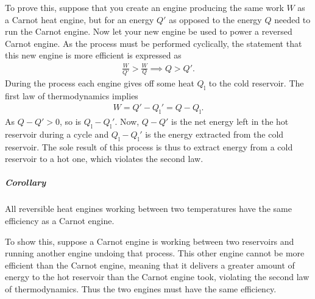 To prove this, suppose that you create an engine producing the same work $W$ as a Carnot heat engine, but for an energy $Q'$ as opposed to the energy $Q$ needed to run the Carnot engine. Now let your new engine be used to power a reversed Carnot engine. As the process must be performed cyclically, the statement that this new engine is more efficient is expressed as
\begin{align*}
	\frac{W}{Q'} > \frac{W}{Q} \implies Q > Q'.
\end{align*}
During the process each engine gives off some heat $Q_{\text{l}}$ to the cold reservoir. The first law of thermodynamics implies
\begin{align*}
	W = Q' - Q_{\text{l}}' = Q - Q_{\text{l}}.
\end{align*}
As $Q - Q' > 0$, so is $Q_{\text{l}} - Q_{\text{l}}'$. Now, $Q - Q'$ is the net energy left in the hot reservoir during a cycle and $Q_{\text{l}} - Q_{\text{l}}'$ is the energy extracted from the cold reservoir. The sole result of this process is thus to extract energy from a cold reservoir to a hot one, which violates the second law.

\subparagraph{Corollary}
All reversible heat engines working between two temperatures have the same efficiency as a Carnot engine.

To show this, suppose a Carnot engine is working between two reservoirs and running another engine undoing that process. This other engine cannot be more efficient than the Carnot engine, meaning that it delivers a greater amount of energy to the hot reservoir than the Carnot engine took, violating the second law of thermodynamics. Thus the two engines must have the same efficiency.

